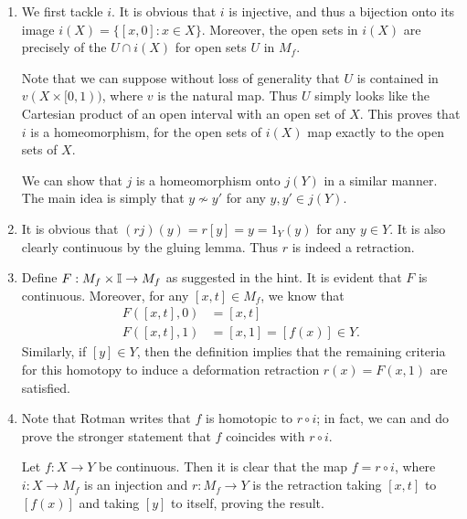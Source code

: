 \documentclass[../../solutions.tex]{subfiles}
\begin{document}
\begin{exercise} \leavevmode
\begin{enumerate}
\item We first tackle $i$. It is obvious that $i$ is injective, and thus a bijection onto its image $i(X)=\{[x,0]:x\in X\}$. Moreover, the open sets in $i(X)$ are precisely of the $U\cap i(X)$ for open sets $U$ in $M_f$. 

Note that we can suppose without loss of generality that $U$ is contained in $v(X\times[0,1))$, where $v$ is the natural map. Thus $U$ simply looks like the Cartesian product of an open interval with an open set of $X$. This proves that $i$ is a homeomorphism, for the open sets of $i(X)$ map exactly to the open sets of $X$. 

We can show that $j$ is a homeomorphism onto $j(Y)$ in a similar manner. The main idea is simply that $y\not\sim y'$ for any $y,y'\in j(Y)$. 

\item It is obvious that $(rj)(y)=r[y]=y=1_Y(y)$ for any $y\in Y$. It is also clearly continuous by the gluing lemma. Thus $r$ is indeed a retraction. 

\item Define $F:M_f\times\mathbb I\to M_f$ as suggested in the hint. It is evident that $F$ is continuous. Moreover, for any $[x,t]\in M_f$, we know that \begin{align*}F([x,t],0)&=[x,t]\\F([x,t],1)&=[x,1]=[f(x)]\in Y.\end{align*} Similarly, if $[y]\in Y$, then the definition implies that the remaining criteria for this homotopy to induce a deformation retraction $r(x)=F(x,1)$ are satisfied. 

\item Note that Rotman writes that $f$ is homotopic to $r\circ i$; in fact, we can and do prove the stronger statement that $f$ coincides with $r\circ i$. 

Let $f:X\to Y$ be continuous. Then it is clear that the map $f=r\circ i$, where $i:X\to M_f$ is an injection and $r:M_f\to Y$ is the retraction taking $[x,t]$ to $[f(x)]$ and taking $[y]$ to itself, proving the result. 
\end{enumerate} 
\end{exercise} 
\end{document}
